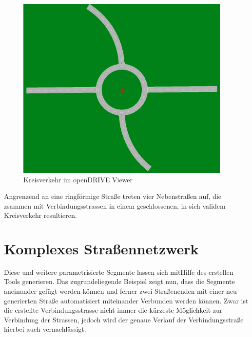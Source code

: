 \begin{figure}[H]
	\flushleft
	\includegraphics[width=0.95\textwidth]{fig/fig7.png}
	\caption{Kreisverkehr im openDRIVE Viewer}
	\label{abb6}
\end{figure}

Angrenzend an eine ringförmige Straße treten vier Nebenstraßen auf, die zsammen  mit Verbindungsstrassen in einem geschlossenen, in sich validem Kreisverkehr resultieren.   

\section{Komplexes Straßennetzwerk}

Diese und weitere parametrisierte Segmente lassen sich mitHilfe des erstellen Tools generieren. Das zugrundeliegende Beispiel zeigt nun, dass die Segmente aneinander gefügt werden können und ferner zwei Straßenenden mit einer neu generierten Straße automatisiert miteinander Verbunden werden können. Zwar ist die erstellte Verbindungsstrasse nicht immer die kürzeste Möglichkeit zur Verbindung der Strassen, jedoch wird der genaue Verlauf der Verbindungsstraße hierbei auch vernachlässigt.

